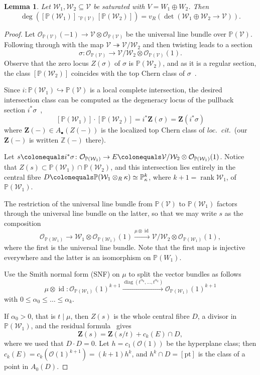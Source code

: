 \documentclass[11pt,a4paper]{amsart}
\newcommand{\Pp}{\mathbb{P}}
\newcommand{\Z}{\mathbb{Z}}
\newcommand{\Zloc}{\mathbf{Z}} %
\DeclareMathOperator{\rank}{rank}
\DeclareMathOperator{\diag}{diag}
\theoremstyle{plain}
\newtheorem{lemma}[theorem]{Lemma}
\theoremstyle{definition}
\theoremstyle{remark}
\DeclareMathOperator{\id}{id}
\newcommand{\co}{\mathcal{O}}
\newcommand{\cw}{\mathcal{W}}
\newcommand{\cv}{\mathcal{V}}
\newcommand{\too}{\longrightarrow}
\newcommand{\tos}{\twoheadrightarrow}
\newcommand{\toi}{\hookrightarrow}
\newcommand{\coleq}{\colonequals}
\begin{document}
\begin{lemma}
  \label{lem:intersection}
  Let $\cw_1,\cw_2\subseteq\cv$ be saturated with $V = W_1\oplus W_2$. Then
  \[
   \deg ([\Pp(\cw_1)]\cdot_{\Pp(\cv)} [\Pp(\cw_2)]) = v_R(\det \left( \cw_1\oplus \cw_2 \to \cv \right) ).
  \]
\end{lemma}
\begin{proof}
  Let $\co_{\Pp(\cv)}(-1) \to \cv \otimes \co_{\Pp(\cv)}$ be the universal line bundle over $\Pp(\cv)$. Following through with the map $\cv \tos \cv/\cw_2$ and then twisting leads to a section
  \[
    \sigma \colon \co_{\Pp(\cv)} \to \cv/\cw_2 \otimes \co_{\Pp(\cv)}(1).
  \]
  Observe that the zero locus $Z(\sigma)$ of $\sigma$ is $\Pp(\cw_2)$, and as it is a regular section, the class $[\Pp(\cw_2)]$ coincides with the top Chern class of $\sigma$~\cite[\S14.1]{Fulton1998}. 

  Since $i \colon \Pp(\cw_1) \toi \Pp(\cv)$ is a local complete intersection, the desired intersection class can be computed as the degeneracy locus of the pullback section $i^*\sigma$~\cite[Prop. 14.1.d.ii]{Fulton1998},
  \[
    [\Pp(\cw_1)]\cdot [\Pp(\cw_2)] = i^*\Zloc(\sigma) = \Zloc(i^*\sigma)
  \]
  where $\Zloc(-) \in A_\bullet(Z(-))$ is the localized top Chern class of \emph{loc.\ cit.}\ (our $\Zloc(-)$ is written $\mathbb{Z}(-)$ there).

  Let $s \coleq i^*\sigma \colon \co_{\Pp(\cw_1)} \to E \coleq \cv/\cw_2 \otimes \co_{\Pp(\cw_1)}(1)$. Notice that $Z(s) \subset \Pp(\cw_1) \cap \Pp(\cw_2)$, and this intersection lies entirely in the central fibre $D \coleq \Pp(\cw_1 \otimes_R \kappa) \simeq \Pp^k_\kappa$, where $k+1 = \rank \cw_1$, of $\Pp(\cw_1)$.

The restriction of the universal line bundle from $\Pp(\cv)$ to $\Pp(\cw_1)$ factors through the universal line bundle on the latter, so that we may write $s$ as the composition
\[
  \co_{\Pp(\cw_1)} \to \cw_1 \otimes \co_{\Pp(\cw_1)}(1) \overset{\mu \otimes \id}{\too} \cv/\cw_2 \otimes \co_{\Pp(\cw_1)}(1),
\]
where the first is the universal line bundle. Note that the first map is injective everywhere and the latter is an isomorphism on $\Pp(W_1)$.

Use the Smith normal form (SNF) on $\mu$ to split the vector bundles as follows
\[
  \mu\otimes \id \colon \co_{\Pp(\cw_1)}(1)^{k+1} \xrightarrow{\diag(t^{\alpha_0}, \dots, t^{\alpha_k})} \co_{\Pp(\cw_1)}(1)^{k+1}  
\]
with $0 \le \alpha_0 \le \dots \le \alpha_k$.


If $\alpha_0 > 0$, that is $t \mid \mu$, then $Z(s)$ is the whole central fibre $D$, a divisor in $\Pp(\cw_1)$, and the residual formula~\cite[Example 14.1.4]{Fulton1998} gives
\[
  \Zloc(s) = \Zloc(s/t) + c_{k}(E)\cap D,
\]
where we used that $D \cdot D = 0$. Let $h = c_1(\co(1))$ be the hyperplane class; then $c_k(E) = c_k(\co(1)^{k+1}) = (k+1) h^k$, and $h^k \cap D = [\mathrm{pt}]$ is the class of a point in $A_0(D)$. 


\end{proof}
\end{document}
